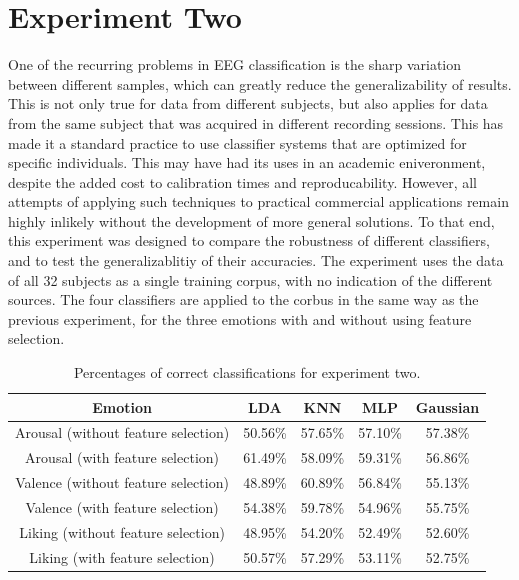 \documentclass[12pt, a4paper, fleqn]{memoir}%
\begin{document}
\section{Experiment Two}
\label{sec:exp2}
One of the recurring problems in EEG classification is the sharp variation between different samples, which can greatly reduce the generalizability of results. This is not only true for data from different subjects, but also applies for data from the same subject that was acquired in different recording sessions. This has made it a standard practice to use classifier systems that are optimized for specific individuals. This may have had its uses in an academic eniveronment, despite the added cost to calibration times and reproducability. However, all attempts of applying such techniques to practical commercial applications remain highly inlikely without the development of more general solutions. To that end, this experiment was designed to compare the robustness of different classifiers, and to test the generalizablitiy of their accuracies. The experiment uses the data of all 32 subjects as a single training corpus, with no indication of the different sources. The four classifiers are applied to the corbus in the same way as the previous experiment, for the three emotions with and without using feature selection.

\begin{table}[!h]
	\begin{tabular}{| c | c | c | c | c |}
		\hline \hline
		Emotion 				& LDA     & KNN     & MLP     & Gaussian \\
		\hline \hline
		Arousal (without feature selection)     & 50.56\% & 57.65\% & 57.10\% & 57.38\%  \\ \hline
		Arousal (with feature selection)	& 61.49\% & 58.09\% & 59.31\% & 56.86\%  \\ \hline
		\hline
		Valence (without feature selection)	& 48.89\% & 60.89\% & 56.84\% & 55.13\%  \\ \hline
		Valence (with feature selection)   	& 54.38\% & 59.78\% & 54.96\% & 55.75\%  \\ \hline
		\hline
		Liking  (without feature selection) 	& 48.95\% & 54.20\% & 52.49\% & 52.60\%  \\ \hline
		Liking  (with feature selection)     	& 50.57\% & 57.29\% & 53.11\% & 52.75\%  \\ \hline
		\hline
	\end{tabular}
	\caption{Percentages of correct classifications for experiment two.}
	\label{table:exp2}
\end{table}
\end{document}
